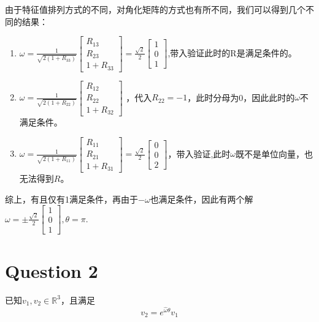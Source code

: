 \documentclass{ctexart}
\begin{document}
由于特征值排列方式的不同，对角化矩阵的方式也有所不同，我们可以得到几个不同的结果：
\begin{enumerate}
	\item $\omega = \frac{1}{\sqrt{2(1+R_{33})}}\begin{bmatrix}
		      R_{13} \\
		      R_{23} \\
		      1+R_{33}
	      \end{bmatrix} =\frac{\sqrt{2}}{2} \begin{bmatrix}
		      1 \\
			  0 \\
			  1
	      \end{bmatrix}$,带入验证此时的R是满足条件的。
	\item $\omega = \frac{1}{\sqrt{2(1+R_{22})}}\begin{bmatrix}
		      R_{12} \\
		      R_{22} \\
		      1+R_{32}
	      \end{bmatrix}$ ，代入$R_{22} = -1$，此时分母为0，因此此时的$\omega$不满足条件。
	\item $\omega = \frac{1}{\sqrt{2(1+R_{11})}}\begin{bmatrix}
		      R_{11} \\
		      R_{21} \\
		      1+R_{31}
	\end{bmatrix} = \frac{\sqrt{2}}{2} \begin{bmatrix}
		0 \\
		0 \\
		2
	\end{bmatrix}$，带入验证,此时$\omega$既不是单位向量，也无法得到$R$。
		
\end{enumerate}
综上，有且仅有1满足条件，再由于$-\omega$也满足条件，因此有两个解$\omega = \pm \frac{\sqrt{2}}{2} \begin{bmatrix}
	1 \\
	0 \\
	1
\end{bmatrix},\theta = \pi$.

\section*{Question 2}
已知$v_1,v_2 \in \mathbb{R}^3$，且满足
\begin{equation*}
	v_2 = e ^ {\hat{\omega} \theta} v_1
\end{equation*}
\end{document}
